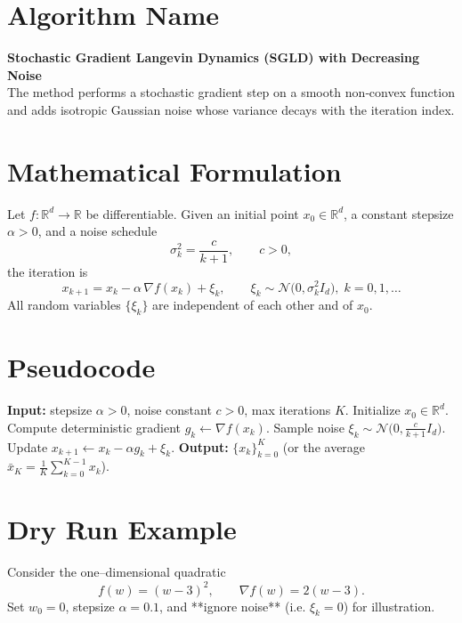 \documentclass{article}
\newcommand{\R}{\mathbb{R}}
\begin{document}
\section*{Algorithm Name}
\textbf{Stochastic Gradient Langevin Dynamics (SGLD) with Decreasing Noise}\\
The method performs a stochastic gradient step on a smooth non‑convex function and adds isotropic Gaussian noise whose variance decays with the iteration index.

\section*{Mathematical Formulation}
Let $f:\R^{d}\rightarrow\R$ be differentiable.  
Given an initial point $x_{0}\in\R^{d}$, a constant stepsize $\alpha>0$, and a noise schedule
\[
\sigma_{k}^{2}= \frac{c}{k+1},\qquad c>0,
\]
the iteration is
\begin{equation}
\boxed{
x_{k+1}=x_{k}-\alpha\,\nabla f(x_{k})+\xi_{k},\qquad 
\xi_{k}\sim\mathcal N\!\bigl(0,\sigma_{k}^{2}I_{d}\bigr),\;k=0,1,\dots
}
\label{eq:update}
\end{equation}
All random variables $\{\xi_{k}\}$ are independent of each other and of $x_{0}$.

\section*{Pseudocode}
\begin{algorithm}[H]
\caption{SGLD with Decreasing Noise}
\begin{algorithmic}[1]
\State \textbf{Input:} stepsize $\alpha>0$, noise constant $c>0$, max iterations $K$.
\State Initialize $x_{0}\in\R^{d}$.
    \State Compute deterministic gradient $g_{k}\gets\nabla f(x_{k})$.
    \State Sample noise $\xi_{k}\sim\mathcal N\!\bigl(0,\frac{c}{k+1}I_{d}\bigr)$.
    \State Update $x_{k+1}\gets x_{k}-\alpha g_{k}+ \xi_{k}$.
\EndFor
\State \textbf{Output:} $\{x_{k}\}_{k=0}^{K}$ (or the average $\bar x_{K}=\frac1K\sum_{k=0}^{K-1}x_{k}$).
\end{algorithmic}
\end{algorithm}

\section*{Dry Run Example}
Consider the one–dimensional quadratic
\[
f(w)=(w-3)^{2},\qquad \nabla f(w)=2(w-3).
\]
Set $w_{0}=0$, stepsize $\alpha=0.1$, and **ignore noise** (i.e. $\xi_{k}=0$) for illustration.
\end{document}
